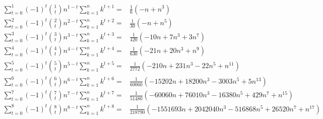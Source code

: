 \begin{equation*}
    \begin{split}
        \sum_{t=0}^{1} (-1)^t \binom{1}{t} n^{1-t} \sum_{k=1}^{n} k^{t+1} =& \frac{1}{6} (-n + n^3) \\
        \sum_{t=0}^{2} (-1)^t \binom{2}{t} n^{2-t} \sum_{k=1}^{n} k^{t+2} =& \frac{1}{30} (-n + n^5) \\
        \sum_{t=0}^{3} (-1)^t \binom{3}{t} n^{3-t} \sum_{k=1}^{n} k^{t+3} =& \frac{1}{420} (-10 n + 7 n^3 + 3 n^7) \\
        \sum_{t=0}^{4} (-1)^t \binom{4}{t} n^{4-t} \sum_{k=1}^{n} k^{t+4} =& \frac{1}{630} (-21 n + 20 n^3 + n^9) \\
        \sum_{t=0}^{5} (-1)^t \binom{5}{t} n^{5-t} \sum_{k=1}^{n} k^{t+5} =& \frac{1}{2772} (-210 n + 231 n^3 - 22 n^5 + n^{11}) \\
        \sum_{t=0}^{6} (-1)^t \binom{6}{t} n^{6-t} \sum_{k=1}^{n} k^{t+6} =& \frac{1}{60060} (-15202 n + 18200 n^3 - 3003 n^5 + 5 n^{13}) \\
        \sum_{t=0}^{7} (-1)^t \binom{7}{t} n^{7-t} \sum_{k=1}^{n} k^{t+7} =& \frac{1}{51480} (-60060 n + 76010 n^3 - 16380 n^5 + 429 n^7 + n^{15}) \\
        \sum_{t=0}^{8} (-1)^t \binom{8}{t} n^{8-t} \sum_{k=1}^{n} k^{t+8} =& \frac{1}{218790} (-1551693 n + 2042040 n^3 - 516868 n^5 + 26520 n^7 + n^{17})
    \end{split}
\end{equation*}
